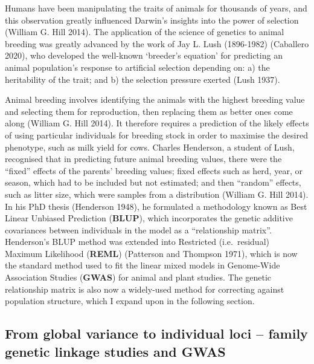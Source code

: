 \documentclass[
]{book}
\begin{document}
Humans have been manipulating the traits of animals for thousands of years, and this observation greatly influenced Darwin's insights into the power of selection (William G. Hill 2014). The application of the science of genetics to animal breeding was greatly advanced by the work of Jay L. Lush (1896-1982) (Caballero 2020), who developed the well-known `breeder's equation' for predicting an animal population's response to artificial selection depending on: a) the heritability of the trait; and b) the selection pressure exerted (Lush 1937).

Animal breeding involves identifying the animals with the highest breeding value and selecting them for reproduction, then replacing them as better ones come along (William G. Hill 2014). It therefore requires a prediction of the likely effects of using particular individuals for breeding stock in order to maximise the desired phenotype, such as milk yield for cows. Charles Henderson, a student of Lush, recognised that in predicting future animal breeding values, there were the ``fixed'' effects of the parents' breeding values; fixed effects such as herd, year, or season, which had to be included but not estimated; and then ``random'' effects, such as litter size, which were samples from a distribution (William G. Hill 2014). In his PhD thesis (Henderson 1948), he formulated a methodology known as Best Linear Unbiased Prediction (\textbf{BLUP}), which incorporates the genetic additive covariances between individuals in the model as a ``relationship matrix''. Henderson's BLUP method was extended into Restricted (i.e.~residual) Maximum Likelihood (\textbf{REML}) (Patterson and Thompson 1971), which is now the standard method used to fit the linear mixed models in Genome-Wide Association Studies (\textbf{GWAS}) for animal and plant studies. The genetic relationship matrix is also now a widely-used method for correcting against population structure, which I expand upon in the following section.

\hypertarget{GWAS}{%
\subsection{From global variance to individual loci -- family genetic linkage studies and GWAS}\label{GWAS}}
\end{document}

